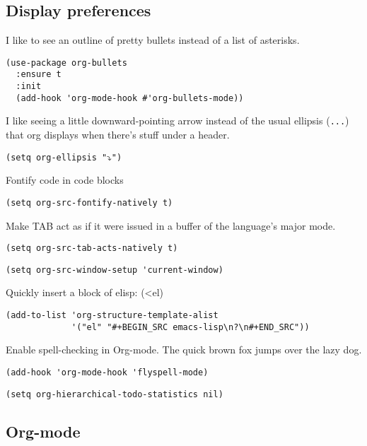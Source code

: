 \documentclass[11pt]{article}
\begin{document}
\subsection{Display preferences}
\label{sec:orga14046d}

I like to see an outline of pretty bullets instead of a list of asterisks.

\begin{verbatim}
(use-package org-bullets
  :ensure t
  :init
  (add-hook 'org-mode-hook #'org-bullets-mode))
\end{verbatim}

I like seeing a little downward-pointing arrow instead of the usual ellipsis
(\texttt{...}) that org displays when there's stuff under a header.

\begin{verbatim}
(setq org-ellipsis "⤵")
\end{verbatim}

Fontify code in code blocks

\begin{verbatim}
(setq org-src-fontify-natively t)
\end{verbatim}

Make TAB act as if it were issued in a buffer of the language’s major mode.

\begin{verbatim}
(setq org-src-tab-acts-natively t)
\end{verbatim}

\begin{verbatim}
(setq org-src-window-setup 'current-window)
\end{verbatim}

Quickly insert a block of elisp: (<el)

\begin{verbatim}
(add-to-list 'org-structure-template-alist
             '("el" "#+BEGIN_SRC emacs-lisp\n?\n#+END_SRC"))
\end{verbatim}

Enable spell-checking in Org-mode. The quick brown fox jumps over the lazy dog.

\begin{verbatim}
(add-hook 'org-mode-hook 'flyspell-mode)
\end{verbatim}

\begin{verbatim}
(setq org-hierarchical-todo-statistics nil)
\end{verbatim}
\subsection{Org-mode}
\label{sec:org8137152}
\end{document}
